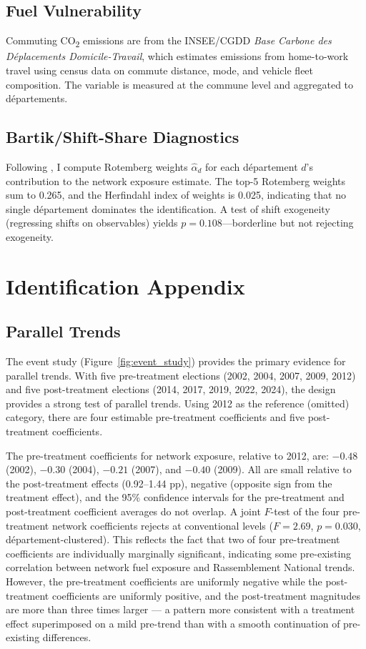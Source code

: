 \documentclass[12pt]{article}
\newcommand{\rn}{Rassemblement National}
\newcommand{\dept}{d\'{e}partement}
\newcommand{\depts}{d\'{e}partements}
\begin{document}
\subsection{Fuel Vulnerability}

Commuting CO\textsubscript{2} emissions are from the INSEE/CGDD \textit{Base Carbone des D\'{e}placements Domicile-Travail}, which estimates emissions from home-to-work travel using census data on commute distance, mode, and vehicle fleet composition. The variable is measured at the commune level and aggregated to \depts{}.

\subsection{Bartik/Shift-Share Diagnostics}

Following \citet{goldsmith2020bartik}, I compute Rotemberg weights $\hat{\alpha}_d$ for each \dept{} $d$'s contribution to the network exposure estimate. The top-5 Rotemberg weights sum to 0.265, and the Herfindahl index of weights is 0.025, indicating that no single \dept{} dominates the identification. A test of shift exogeneity (regressing shifts on observables) yields $p = 0.108$---borderline but not rejecting exogeneity.

\section{Identification Appendix}
\label{app:identification}

\subsection{Parallel Trends}

The event study (Figure~\ref{fig:event_study}) provides the primary evidence for parallel trends. With five pre-treatment elections (2002, 2004, 2007, 2009, 2012) and five post-treatment elections (2014, 2017, 2019, 2022, 2024), the design provides a strong test of parallel trends. Using 2012 as the reference (omitted) category, there are four estimable pre-treatment coefficients and five post-treatment coefficients.

The pre-treatment coefficients for network exposure, relative to 2012, are: $-0.48$ (2002), $-0.30$ (2004), $-0.21$ (2007), and $-0.40$ (2009). All are small relative to the post-treatment effects (0.92--1.44 pp), negative (opposite sign from the treatment effect), and the 95\% confidence intervals for the pre-treatment and post-treatment coefficient averages do not overlap. A joint $F$-test of the four pre-treatment network coefficients rejects at conventional levels ($F = 2.69$, $p = 0.030$, \dept{}-clustered). This reflects the fact that two of four pre-treatment coefficients are individually marginally significant, indicating some pre-existing correlation between network fuel exposure and \rn{} trends. However, the pre-treatment coefficients are uniformly negative while the post-treatment coefficients are uniformly positive, and the post-treatment magnitudes are more than three times larger --- a pattern more consistent with a treatment effect superimposed on a mild pre-trend than with a smooth continuation of pre-existing differences.
\end{document}
